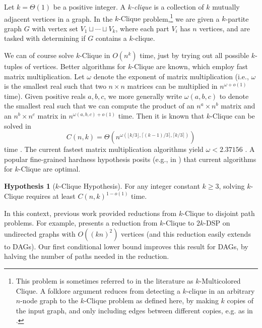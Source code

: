 \documentclass[11pt]{article}
\theoremstyle{definition}
\newtheorem{hypothesis}[theorem]{Hypothesis}
\newcommand\nicole[1]{\textcolor{red}{Nicole says: #1}}
\begin{document}
Let $k = \Theta(1)$ be a positive integer.
A \emph{$k$-clique} is a collection of $k$ mutually adjacent vertices in a graph.
In the \textsf{$k$-Clique} problem,\footnote{This problem is sometimes referred to in the literature as \textsf{$k$-Multicolored Clique}. A folklore argument reduces from detecting a $k$-clique in an arbitrary $n$-node graph to the \textsf{$k$-Clique} problem as defined here, by making $k$ copies of the input graph, and only including edges between different copies, e.g. as in  \cite[Proof of Theorem 13.7]{parameterized-complexity-book}. }
 we are given a $k$-partite graph $G$ with vertex set $V_1\sqcup \cdots \sqcup V_k$, where each part $V_i$ has $n$ vertices,
and
are tasked with determining if $G$ contains a $k$-clique.

We can of course solve \textsf{$k$-Clique} in $O(n^k)$ time, just by trying out all possible $k$-tuples of vertices.
Better algorithms for \textsf{$k$-Clique} are known, which employ fast matrix multiplication.
Let $\omega$ denote the exponent of matrix multiplication (i.e., $\omega$ is the smallest real such that two $n\times n$ matrices can be multiplied in $n^{\omega+o(1)}$ time).
Given positive reals $a,b,c$, we more generally write $\omega(a,b,c)$ to denote 
the smallest real such that we can compute the product of an $n^a\times n^b$ matrix and an $n^b\times n^c$ matrix in $n^{\omega(a,b,c)+o(1)}$ time.
Then it is known that \textsf{$k$-Clique} can be solved in \[C(n,k) = \Theta(n^{\omega(\lfloor k/3\rfloor, \lceil (k-1)/3\rceil, \lceil k/3\rceil)})\]
time \cite{EisenbrandGrandoni2004}.
The current fastest matrix multiplication algorithms yield $\omega < 2.37156$ \cite{even-faster-matrix-mult}.
A popular fine-grained hardness hypothesis posits (e.g., in  \cite{williams2018some,dalirrooyfard2022induced}) that current algorithms for \textsf{$k$-Clique} are optimal.

\begin{hypothesis}[\textsf{$k$-Clique Hypothesis}] For any integer constant $k \geq 3$,  solving \textsf{$k$-Clique} requires at least $C(n,k)^{1-o(1)}$ time.
\end{hypothesis}

In this context, previous work  provided reductions from \textsf{$k$-Clique} to disjoint path problems. 
For example,
\cite{Geometric-Lens-conf} presents a reduction from \textsf{$k$-Clique} to \textsf{$2k$-DSP} on undirected graphs with $O((kn)^2)$ vertices (and this reduction easily extends to DAGs).
Our first conditional lower bound improves this result for DAGs, by halving the number of paths needed in the reduction.
\end{document}
